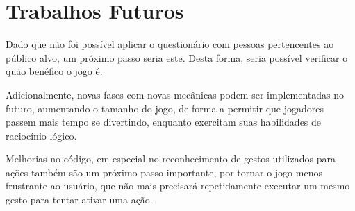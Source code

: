 \section{Trabalhos Futuros}\label{sec-conc-trabalhos-futuros}

Dado que não foi possível aplicar o questionário com pessoas pertencentes ao 
público alvo, um próximo passo seria este. Desta forma, seria possível verificar 
o quão benéfico o jogo é.

Adicionalmente, novas fases com novas mecânicas podem ser implementadas no 
futuro, aumentando o tamanho do jogo, de forma a permitir que jogadores 
passem mais tempo se divertindo, enquanto exercitam suas habilidades de 
raciocínio lógico.

Melhorias no código, em especial no reconhecimento de gestos utilizados 
para ações também são um próximo passo importante, por tornar o jogo 
menos frustrante ao usuário, que não mais precisará repetidamente executar 
um mesmo gesto para tentar ativar uma ação.
